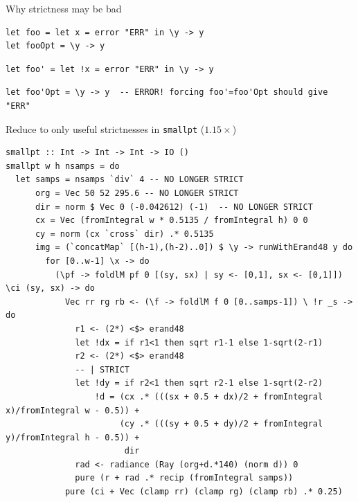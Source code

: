 \documentclass[8pt]{beamer}
\begin{document}
\begin{frame}[fragile]{Why strictness may be bad}
\begin{verbatim}
let foo = let x = error "ERR" in \y -> y
let fooOpt = \y -> y
\end{verbatim}
\pause
\begin{verbatim}
let foo' = let !x = error "ERR" in \y -> y
\end{verbatim}
\pause
\begin{verbatim}
let foo'Opt = \y -> y  -- ERROR! forcing foo'=foo'Opt should give "ERR"
\end{verbatim}
\end{frame}



\begin{frame}[fragile]{ Reduce to only useful strictnesses in \texttt{smallpt} ($1.15\times$)}
\begin{verbatim}
smallpt :: Int -> Int -> Int -> IO ()
smallpt w h nsamps = do
  let samps = nsamps `div` 4 -- NO LONGER STRICT
      org = Vec 50 52 295.6 -- NO LONGER STRICT
      dir = norm $ Vec 0 (-0.042612) (-1)  -- NO LONGER STRICT
      cx = Vec (fromIntegral w * 0.5135 / fromIntegral h) 0 0
      cy = norm (cx `cross` dir) .* 0.5135
      img = (`concatMap` [(h-1),(h-2)..0]) $ \y -> runWithErand48 y do
        for [0..w-1] \x -> do
          (\pf -> foldlM pf 0 [(sy, sx) | sy <- [0,1], sx <- [0,1]]) \ci (sy, sx) -> do
            Vec rr rg rb <- (\f -> foldlM f 0 [0..samps-1]) \ !r _s -> do
              r1 <- (2*) <$> erand48
              let !dx = if r1<1 then sqrt r1-1 else 1-sqrt(2-r1)
              r2 <- (2*) <$> erand48
              -- | STRICT
              let !dy = if r2<1 then sqrt r2-1 else 1-sqrt(2-r2)
                  !d = (cx .* (((sx + 0.5 + dx)/2 + fromIntegral x)/fromIntegral w - 0.5)) +
                       (cy .* (((sy + 0.5 + dy)/2 + fromIntegral y)/fromIntegral h - 0.5)) +
                        dir
              rad <- radiance (Ray (org+d.*140) (norm d)) 0
              pure (r + rad .* recip (fromIntegral samps))
            pure (ci + Vec (clamp rr) (clamp rg) (clamp rb) .* 0.25)
\end{verbatim}

\end{frame}
\end{document}
